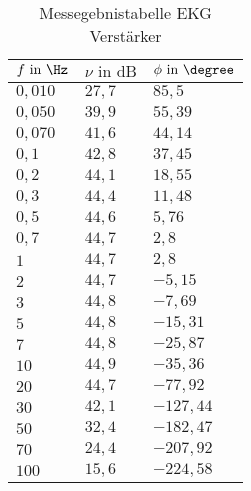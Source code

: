 \begin{table}[]
\centering
\caption{Messegebnistabelle EKG Verstärker}
\label{tab:ergTable_ekg}
\begin{tabular}{|l|l|l|}
\hline
\rowcolor[HTML]{C0C0C0} 
$f\text{ in }\Hz     $&$ \nu \text{ in dB}    $&$ \phi \text{ in } \degree    $\\ \hline
$0,010 $&$ 27,7 $&$ 85,5    $\\ \hline
$0,050 $&$ 39,9 $&$ 55,39   $\\ \hline
$0,070 $&$ 41,6 $&$ 44,14   $\\ \hline
$0,1   $&$ 42,8 $&$ 37,45   $\\ \hline
$0,2   $&$ 44,1 $&$ 18,55   $\\ \hline
$0,3   $&$ 44,4 $&$ 11,48   $\\ \hline
$0,5   $&$ 44,6 $&$ 5,76    $\\ \hline
$0,7   $&$ 44,7 $&$ 2,8     $\\ \hline
$1     $&$ 44,7 $&$ 2,8     $\\ \hline
$2     $&$ 44,7 $&$ -5,15   $\\ \hline
$3     $&$ 44,8 $&$ -7,69   $\\ \hline
$5     $&$ 44,8 $&$ -15,31  $\\ \hline
$7     $&$ 44,8 $&$ -25,87  $\\ \hline
$10    $&$ 44,9 $&$ -35,36  $\\ \hline
$20    $&$ 44,7 $&$ -77,92  $\\ \hline
$30    $&$ 42,1 $&$ -127,44 $\\ \hline
$50    $&$ 32,4 $&$ -182,47 $\\ \hline
$70    $&$ 24,4 $&$ -207,92 $\\ \hline
$100   $&$ 15,6 $&$ -224,58 $\\ \hline
\end{tabular}
\end{table}